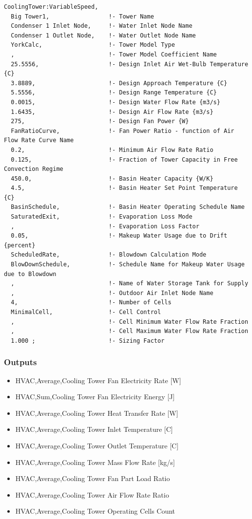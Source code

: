 \begin{lstlisting}
CoolingTower:VariableSpeed,
  Big Tower1,                 !- Tower Name
  Condenser 1 Inlet Node,     !- Water Inlet Node Name
  Condenser 1 Outlet Node,    !- Water Outlet Node Name
  YorkCalc,                   !- Tower Model Type
  ,                           !- Tower Model Coefficient Name
  25.5556,                    !- Design Inlet Air Wet-Bulb Temperature {C}
  3.8889,                     !- Design Approach Temperature {C}
  5.5556,                     !- Design Range Temperature {C}
  0.0015,                     !- Design Water Flow Rate {m3/s}
  1.6435,                     !- Design Air Flow Rate {m3/s}
  275,                        !- Design Fan Power {W}
  FanRatioCurve,              !- Fan Power Ratio - function of Air Flow Rate Curve Name
  0.2,                        !- Minimum Air Flow Rate Ratio
  0.125,                      !- Fraction of Tower Capacity in Free Convection Regime
  450.0,                      !- Basin Heater Capacity {W/K}
  4.5,                        !- Basin Heater Set Point Temperature {C}
  BasinSchedule,              !- Basin Heater Operating Schedule Name
  SaturatedExit,              !- Evaporation Loss Mode
  ,                           !- Evaporation Loss Factor
  0.05,                       !- Makeup Water Usage due to Drift {percent}
  ScheduledRate,              !- Blowdown Calculation Mode
  BlowDownSchedule,           !- Schedule Name for Makeup Water Usage due to Blowdown
  ,                           !- Name of Water Storage Tank for Supply
  ,                           !- Outdoor Air Inlet Node Name
  4,                          !- Number of Cells
  MinimalCell,                !- Cell Control
  ,                           !- Cell Minimum Water Flow Rate Fraction
  ,                           !- Cell Maximum Water Flow Rate Fraction
  1.000 ;                     !- Sizing Factor
\end{lstlisting}

\subsubsection{Outputs}\label{outputs-3-001}

\begin{itemize}
\item
  HVAC,Average,Cooling Tower Fan Electricity Rate {[}W{]}
\item
  HVAC,Sum,Cooling Tower Fan Electricity Energy {[}J{]}
\item
  HVAC,Average,Cooling Tower Heat Transfer Rate {[}W{]}
\item
  HVAC,Average,Cooling Tower Inlet Temperature {[}C{]}
\item
  HVAC,Average,Cooling Tower Outlet Temperature {[}C{]}
\item
  HVAC,Average,Cooling Tower Mass Flow Rate {[}kg/s{]}
\item
  HVAC,Average,Cooling Tower Fan Part Load Ratio
\item
  HVAC,Average,Cooling Tower Air Flow Rate Ratio
\item
  HVAC,Average,Cooling Tower Operating Cells Count
\end{itemize}

